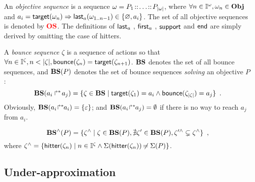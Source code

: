 \begin{definition}
\label{def:OS}
  An \emph{objective sequence} is a sequence $\omega = P_1 \!::\! \dots \!::\! P_{|\omega|}$,
  where $\forall n \in \mathbb{I}^{\omega}, \omega_n \in \mathbf{Obj}$ and $a_i = \mathsf{target}(\omega_n) \Rightarrow \mathsf{last}_a(\omega_{1..n-1}) \in \{ \varnothing, a_i \}$.
  The set of all objective sequences is denoted by $\textcolor{red}{\mathbf{OS}}$.
  The definitions of $\mathsf{last}_a$ , $\mathsf{first}_a$ , $\mathsf{support}$  and $\mathsf{end}$ 
  are simply derived by omitting the case of hitters.
\end{definition}

\begin{definition}
\label{def:bs}
  A \emph{bounce sequence} $\zeta$ is a sequence of actions so that $\forall n \in \mathbb{I}^{\zeta}, n < |\zeta|, \mathsf{bounce}(\zeta_{n}) = \mathsf{target}(\zeta_{n+1})$.
  $\mathbf{BS}$ denotes the set of all bounce sequences, and
  $\mathbf{BS}(P)$ denotes the set of bounce sequences \emph{solving} an objective $P$:
  \[
    \mathbf{BS}(\mbox{$a_i\Rsh^*\!a_j$}) = \{ \zeta \in \mathbf{BS} \mid \mathsf{target}(\zeta_1)= a_i \wedge \mathsf{bounce}(\zeta_{|\zeta|}) = a_j \} \enspace.
  \]
  Obviously, $\mathbf{BS}({a_i\!\Rsh^*\!\!a_i}) = \{\varepsilon\}$; and $\mathbf{BS}({a_i\!\Rsh^*\!\!a_j}) = \emptyset$ if there is no way to reach $a_j$ from $a_i$.
\end{definition}

\begin{definition}[$\aBS:\Obj \mapsto \powerset(\Proc)$]
\label{def:aBS}
  \[
    \mathbf{BS}^\wedge(P) = \{ \zeta^\wedge \mid \zeta \in \mathbf{BS}(P), \nexists \zeta' \in \mathbf{BS}(P), \zeta'^\wedge \subsetneq \zeta^\wedge \} \enspace,
  \]
  where $\zeta^\wedge = \{ \mathsf{hitter}(\zeta_n) \mid  n \in \mathbb{I}^{\zeta} \wedge \Sigma(\mathsf{hitter}(\zeta_n)) \not\nobreak\mkern -2mu = \Sigma(P) \}$.
\end{definition}



\subsection{Under-approximation}

